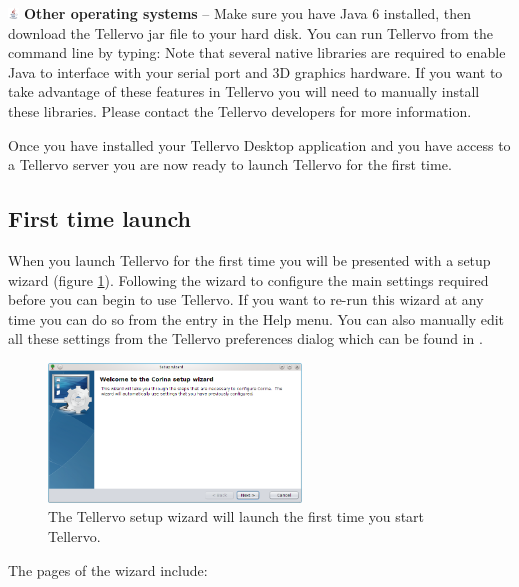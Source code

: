 \begin{description}
\item \includegraphics[width=3mm]{Images/java.png} \textbf{Other operating systems} -- Make sure you have Java 6 installed, then download the Tellervo jar file to your hard disk. You can run Tellervo from the command line by typing:   Note that several native libraries are required to enable Java to interface with your serial port and 3D graphics hardware.  If you want to take advantage of these features in Tellervo you will need to manually install these libraries.  Please contact the Tellervo developers for more information.
\end{description}

Once you have installed your Tellervo Desktop application and you have access to a Tellervo server you are now ready to launch Tellervo for the first time.

\subsection{First time launch}
When you launch Tellervo for the first time you will be presented with a setup wizard (figure \ref{fig:setupwizard}).  Following the wizard to configure the main settings required before you can begin to use Tellervo.  If you want to re-run this wizard at any time you can do so from the entry in the Help menu. You can also manually edit all these settings from the Tellervo preferences dialog which can be found in .

\begin{figure}[hbtp]
  \centering
    \includegraphics[width=0.6\textwidth]{Images/setupwizard.png}
  \caption{The Tellervo setup wizard will launch the first time you start Tellervo.}
  \label{fig:setupwizard}
\end{figure}

The pages of the wizard include:

